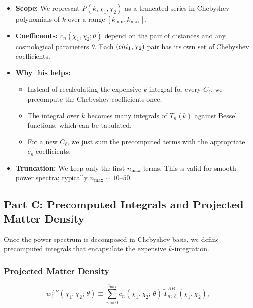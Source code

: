 \begin{itemize}[leftmargin=1.5cm]
    \item \textbf{Scope:} We represent $P(k, \chi_1, \chi_2)$ as a truncated series in Chebyshev polynomials of $k$ over a range $[k_{\min}, k_{\max}]$.
    
    \item \textbf{Coefficients:} $c_n(\chi_1, \chi_2; \theta)$ depend on the pair of distances and any cosmological parameters $\theta$. Each $(\\chi_1, \chi_2)$ pair has its own set of Chebyshev coefficients.
    
    \item \textbf{Why this helps:}
    \begin{itemize}
        \item Instead of recalculating the expensive $k$-integral for every $C_\ell$, we precompute the Chebyshev coefficients once.
        \item The integral over $k$ becomes many integrals of $T_n(k)$ against Bessel functions, which can be tabulated.
        \item For a new $C_\ell$, we just sum the precomputed terms with the appropriate $c_n$ coefficients.
    \end{itemize}
    
    \item \textbf{Truncation:} We keep only the first $n_{\max}$ terms. This is valid for smooth power spectra; typically $n_{\max} \sim 10$--$50$.
\end{itemize}

\subsection{Part C: Precomputed Integrals and Projected Matter Density}

Once the power spectrum is decomposed in Chebyshev basis, we define precomputed integrals that encapsulate the expensive $k$-integration.

\subsubsection{Projected Matter Density}

\begin{equation}
    w^{AB}_\ell(\chi_1,\chi_2;\,\theta) \equiv
    \sum_{n=0}^{n_{\max}} c_n(\chi_1,\chi_2;\,\theta)\,
    \tilde{T}^{AB}_{n;\ell}(\chi_1,\chi_2),
    \label{eq:w_ell}
\end{equation}

